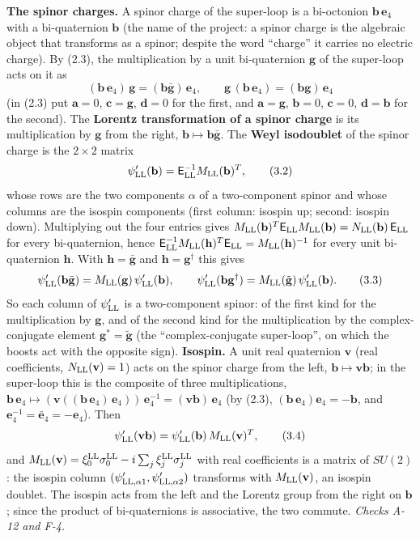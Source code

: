 \documentclass[
  10pt,
]{article}
\begin{document}
\textbf{The spinor charges.} A spinor charge of the super-loop is a
bi-octonion \(\mathbf b\,\mathbf e_4\) with a bi-quaternion
\(\mathbf b\) (the name of the project: a spinor charge is the algebraic
object that transforms as a spinor; despite the word ``charge'' it
carries no electric charge). By (2.3), the multiplication by a unit
bi-quaternion \(\mathbf g\) of the super-loop acts on it as
\[(\mathbf b\,\mathbf e_4)\,\mathbf g=(\mathbf b\bar{\mathbf g})\,\mathbf e_4,\qquad\mathbf g\,(\mathbf b\,\mathbf e_4)=(\mathbf b\mathbf g)\,\mathbf e_4\tag{3.1}\]
(in (2.3) put \(\mathbf a=0\), \(\mathbf c=\mathbf g\), \(\mathbf d=0\)
for the first, and \(\mathbf a=\mathbf g\), \(\mathbf b=0\),
\(\mathbf c=0\), \(\mathbf d=\mathbf b\) for the second). The
\textbf{Lorentz transformation of a spinor charge} is its multiplication
by \(\mathbf g\) from the right,
\(\mathbf b\mapsto\mathbf b\bar{\mathbf g}\). The \textbf{Weyl
isodoublet} of the spinor charge is the \(2\times2\) matrix
\[\psi'_{\rm LL}(\mathbf b)=\mathsf E_{\rm LL}^{-1}M_{\rm LL}(\mathbf b)^T,\tag{3.2}\]
whose rows are the two components \(\alpha\) of a two-component spinor
and whose columns are the isospin components (first column: isospin up;
second: isospin down). Multiplying out the four entries gives
\(M_{\rm LL}(\mathbf b)^T\mathsf E_{\rm LL}M_{\rm LL}(\mathbf b)=N_{\rm LL}(\mathbf b)\,\mathsf E_{\rm LL}\)
for every bi-quaternion, hence
\(\mathsf E_{\rm LL}^{-1}M_{\rm LL}(\mathbf h)^T\mathsf E_{\rm LL}=M_{\rm LL}(\mathbf h)^{-1}\)
for every unit bi-quaternion \(\mathbf h\). With
\(\mathbf h=\bar{\mathbf g}\) and \(\mathbf h=\mathbf g^\dagger\) this
gives
\[\psi'_{\rm LL}(\mathbf b\bar{\mathbf g})=M_{\rm LL}(\mathbf g)\,\psi'_{\rm LL}(\mathbf b),\qquad\psi'_{\rm LL}(\mathbf b\mathbf g^\dagger)=M_{\rm LL}(\tilde{\mathbf g})\,\psi'_{\rm LL}(\mathbf b).\tag{3.3}\]
So each column of \(\psi'_{\rm LL}\) is a two-component spinor: of the
first kind for the multiplication by \(\mathbf g\), and of the second
kind for the multiplication by the complex-conjugate element
\(\mathbf g^*=\tilde{\mathbf g}\) (the ``complex-conjugate super-loop'',
on which the boosts act with the opposite sign). \textbf{Isospin.} A
unit real quaternion \(\mathbf v\) (real coefficients,
\(N_{\rm LL}(\mathbf v)=1\)) acts on the spinor charge from the left,
\(\mathbf b\mapsto\mathbf v\mathbf b\); in the super-loop this is the
composite of three multiplications,
\(\mathbf b\,\mathbf e_4\mapsto(\mathbf v((\mathbf b\,\mathbf e_4)\,\mathbf e_4))\,\mathbf e_4^{-1}=(\mathbf v\mathbf b)\,\mathbf e_4\)
(by (2.3), \((\mathbf b\,\mathbf e_4)\mathbf e_4=-\mathbf b\), and
\(\mathbf e_4^{-1}=\bar{\mathbf e}_4=-\mathbf e_4\)). Then
\[\psi'_{\rm LL}(\mathbf v\mathbf b)=\psi'_{\rm LL}(\mathbf b)\,M_{\rm LL}(\mathbf v)^T,\tag{3.4}\]
and
\(M_{\rm LL}(\mathbf v)=\xi^{\rm LL}_0\sigma^{\rm LL}_0-i\sum_j\xi^{\rm LL}_j\sigma^{\rm LL}_j\)
with real coefficients is a matrix of \(SU(2)\): the isospin column
\((\psi'_{{\rm LL},\alpha1},\psi'_{{\rm LL},\alpha2})\) transforms with
\(M_{\rm LL}(\mathbf v)\), an isospin doublet. The isospin acts from the
left and the Lorentz group from the right on \(\mathbf b\); since the
product of bi-quaternions is associative, the two commute. \emph{Checks
A-12 and F-4.}
\end{document}
